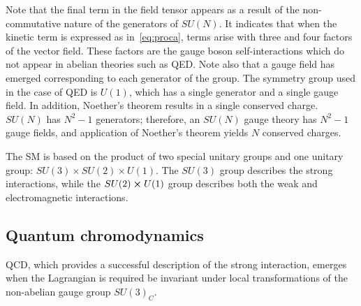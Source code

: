 Note that the final term in the field tensor appears as a result of the
non-commutative nature of the generators of $SU(N)$. It indicates that when the
kinetic term is expressed as in~\cref{eq:proca}, terms arise with three and four
factors of the vector field. These factors are the gauge boson self-interactions
which do not appear in abelian theories such as QED. Note also that a gauge
field has emerged corresponding to each generator of the group. The symmetry
group used in the case of QED is $U(1)$, which has a single generator and a
single gauge field. In addition, Noether's theorem results in a single conserved
charge. $SU(N)$ has $N^2-1$ generators; therefore, an $SU(N)$ gauge theory has
$N^2-1$ gauge fields, and application of Noether's theorem yields $N$ conserved
charges.

The SM is based on the product of two special unitary groups and one unitary
group: $SU(3) \times SU(2) \times U(1)$. The $SU(3)$ group describes the strong
interactions, while the $SU(2) \cross U(1)$ group describes both the weak and
electromagnetic interactions.

\subsection{Quantum chromodynamics}
QCD, which provides a successful description of the strong interaction, emerges
when the Lagrangian is required be invariant under local transformations of the
non-abelian gauge group $SU(3)_C$.

